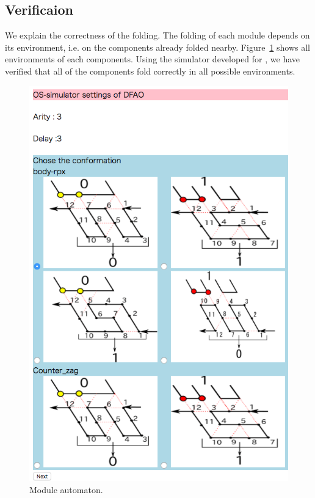 \subsection{Verificaion}
We explain the correctness of the folding.
The folding of each module depends on its environment, i.e. on the components already folded nearby.
Figure~\ref{fig:environments} shows all environments of each components.
Using the simulator developed for \cite{}, we have verified that all of the components fold correctly in all possible environments.



\begin{figure}[htb]
  \begin{center}
  \includegraphics[width=0.8\linewidth, height=0.8\linewidth]{pic/Co-zig1.png}
  \end{center}
\caption{Module automaton.}
\label{fig:environments}

\end{figure}


